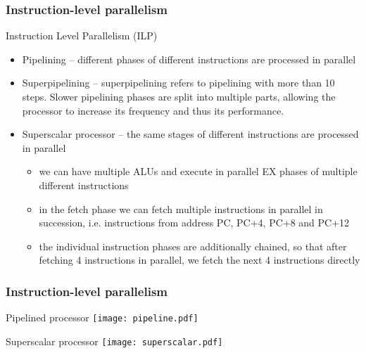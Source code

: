 \documentclass{beamer}
\begin{document}
\begin{frame}
\frametitle{Instruction-level parallelism}

Instruction Level Parallelism (ILP)
\begin{itemize}
 \item Pipelining -- different phases of different instructions are processed in parallel
 \item Superpipelining -- superpipelining refers to pipelining with more than 10 steps. Slower pipelining phases are split into multiple parts, allowing the processor to increase its frequency and thus its performance.
 \item Superscalar processor -- the same stages of different instructions are processed in parallel
\begin{itemize}
\item we can have multiple ALUs and execute in parallel EX phases of multiple different instructions
\item in the fetch phase we can fetch multiple instructions in parallel in succession, i.e. instructions from address PC, PC+4, PC+8 and PC+12
\item the individual instruction phases are additionally chained, so that after fetching 4 instructions in parallel, we fetch the next 4 instructions directly
\end{itemize}
\end{itemize}

\end{frame}

\begin{frame}
\frametitle{Instruction-level parallelism}

Pipelined processor
\texttt{[image: pipeline.pdf]}

Superscalar processor
\texttt{[image: superscalar.pdf]}

\end{frame}
\end{document}
